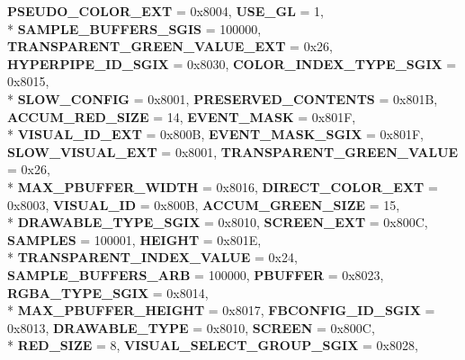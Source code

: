 \begin{DoxyCompactItemize}
{\bfseries P\-S\-E\-U\-D\-O\-\_\-\-C\-O\-L\-O\-R\-\_\-\-E\-X\-T} = 0x8004, 
{\bfseries U\-S\-E\-\_\-\-G\-L} = 1, 
\\*
{\bfseries S\-A\-M\-P\-L\-E\-\_\-\-B\-U\-F\-F\-E\-R\-S\-\_\-\-S\-G\-I\-S} = 100000, 
{\bfseries T\-R\-A\-N\-S\-P\-A\-R\-E\-N\-T\-\_\-\-G\-R\-E\-E\-N\-\_\-\-V\-A\-L\-U\-E\-\_\-\-E\-X\-T} = 0x26, 
{\bfseries H\-Y\-P\-E\-R\-P\-I\-P\-E\-\_\-\-I\-D\-\_\-\-S\-G\-I\-X} = 0x8030, 
{\bfseries C\-O\-L\-O\-R\-\_\-\-I\-N\-D\-E\-X\-\_\-\-T\-Y\-P\-E\-\_\-\-S\-G\-I\-X} = 0x8015, 
\\*
{\bfseries S\-L\-O\-W\-\_\-\-C\-O\-N\-F\-I\-G} = 0x8001, 
{\bfseries P\-R\-E\-S\-E\-R\-V\-E\-D\-\_\-\-C\-O\-N\-T\-E\-N\-T\-S} = 0x801\-B, 
{\bfseries A\-C\-C\-U\-M\-\_\-\-R\-E\-D\-\_\-\-S\-I\-Z\-E} = 14, 
{\bfseries E\-V\-E\-N\-T\-\_\-\-M\-A\-S\-K} = 0x801\-F, 
\\*
{\bfseries V\-I\-S\-U\-A\-L\-\_\-\-I\-D\-\_\-\-E\-X\-T} = 0x800\-B, 
{\bfseries E\-V\-E\-N\-T\-\_\-\-M\-A\-S\-K\-\_\-\-S\-G\-I\-X} = 0x801\-F, 
{\bfseries S\-L\-O\-W\-\_\-\-V\-I\-S\-U\-A\-L\-\_\-\-E\-X\-T} = 0x8001, 
{\bfseries T\-R\-A\-N\-S\-P\-A\-R\-E\-N\-T\-\_\-\-G\-R\-E\-E\-N\-\_\-\-V\-A\-L\-U\-E} = 0x26, 
\\*
{\bfseries M\-A\-X\-\_\-\-P\-B\-U\-F\-F\-E\-R\-\_\-\-W\-I\-D\-T\-H} = 0x8016, 
{\bfseries D\-I\-R\-E\-C\-T\-\_\-\-C\-O\-L\-O\-R\-\_\-\-E\-X\-T} = 0x8003, 
{\bfseries V\-I\-S\-U\-A\-L\-\_\-\-I\-D} = 0x800\-B, 
{\bfseries A\-C\-C\-U\-M\-\_\-\-G\-R\-E\-E\-N\-\_\-\-S\-I\-Z\-E} = 15, 
\\*
{\bfseries D\-R\-A\-W\-A\-B\-L\-E\-\_\-\-T\-Y\-P\-E\-\_\-\-S\-G\-I\-X} = 0x8010, 
{\bfseries S\-C\-R\-E\-E\-N\-\_\-\-E\-X\-T} = 0x800\-C, 
{\bfseries S\-A\-M\-P\-L\-E\-S} = 100001, 
{\bfseries H\-E\-I\-G\-H\-T} = 0x801\-E, 
\\*
{\bfseries T\-R\-A\-N\-S\-P\-A\-R\-E\-N\-T\-\_\-\-I\-N\-D\-E\-X\-\_\-\-V\-A\-L\-U\-E} = 0x24, 
{\bfseries S\-A\-M\-P\-L\-E\-\_\-\-B\-U\-F\-F\-E\-R\-S\-\_\-\-A\-R\-B} = 100000, 
{\bfseries P\-B\-U\-F\-F\-E\-R} = 0x8023, 
{\bfseries R\-G\-B\-A\-\_\-\-T\-Y\-P\-E\-\_\-\-S\-G\-I\-X} = 0x8014, 
\\*
{\bfseries M\-A\-X\-\_\-\-P\-B\-U\-F\-F\-E\-R\-\_\-\-H\-E\-I\-G\-H\-T} = 0x8017, 
{\bfseries F\-B\-C\-O\-N\-F\-I\-G\-\_\-\-I\-D\-\_\-\-S\-G\-I\-X} = 0x8013, 
{\bfseries D\-R\-A\-W\-A\-B\-L\-E\-\_\-\-T\-Y\-P\-E} = 0x8010, 
{\bfseries S\-C\-R\-E\-E\-N} = 0x800\-C, 
\\*
{\bfseries R\-E\-D\-\_\-\-S\-I\-Z\-E} = 8, 
{\bfseries V\-I\-S\-U\-A\-L\-\_\-\-S\-E\-L\-E\-C\-T\-\_\-\-G\-R\-O\-U\-P\-\_\-\-S\-G\-I\-X} = 0x8028, 

\end{DoxyCompactItemize}
